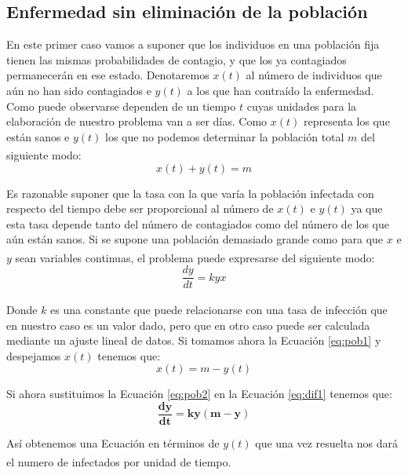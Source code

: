 \documentclass[a4paper,11pt]{article}
\numberwithin{equation}{section}
\begin{document}
\subsection{Enfermedad sin eliminación de la población}
\indent En este primer caso vamos a suponer que los individuos en una población fija tienen las mismas probabilidades de contagio, y que los ya contagiados permanecerán en ese estado. Denotaremos $ x(t) $ al número de individuos que aún no han sido contagiados e $ y(t) $ a los que han contraído la enfermedad. Como puede observarse dependen de un tiempo $ t $ cuyas unidades para la elaboración de nuestro problema van a ser días. Como $ x(t) $ representa los que están sanos e $ y(t) $ los que no podemos determinar la población total $ m $ del siguiente modo{\tiny \bf \textsuperscript{\cite{hoja}}}:
\begin{equation}
x(t)+y(t)=m
\label{eq:pob1}
\end{equation}

\indent Es razonable suponer que la tasa con la que varía la población infectada con respecto del tiempo debe ser proporcional al número de $ x(t) $ e $ y(t) $ ya que esta tasa depende tanto del número de contagiados como del número de los que aún están sanos. Si se supone una población demasiado grande como para que $ x $ e $ y $ sean variables continuas, el problema puede expresarse del siguiente modo{\tiny \bf \textsuperscript{\cite{hoja}}}: 
\begin{equation}
\frac{dy}{dt}=kyx
\label{eq:dif1}
\end{equation}

\indent Donde $ k $ es una constante{\tiny \bf \textsuperscript{\cite{hoja}}} que puede relacionarse con una tasa de infección que en nuestro caso es un valor dado, pero que en otro caso puede ser calculada mediante un ajuste lineal de datos. Si tomamos ahora la Ecuación \ref{eq:pob1} y despejamos $ x(t) $ tenemos que:
\begin{equation}
x(t)=m-y(t)
\label{eq:pob2}
\end{equation}

\indent Si ahora sustituimos la Ecuación \ref{eq:pob2} en la Ecuación \ref{eq:dif1} tenemos que:
\begin{equation}
\boldsymbol{\frac{dy}{dt}=ky(m-y)}
\label{eq:dif2}
\end{equation}

\indent Así obtenemos una Ecuación en términos de $ y(t) $ que una vez resuelta nos dará el numero de infectados por unidad de tiempo{\tiny \bf \textsuperscript{\cite{hoja}}}. \\
\end{document}
